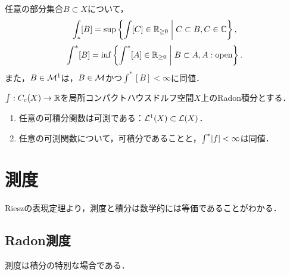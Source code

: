 \documentclass[uplatex,dvipdfmx]{jsreport}
\begin{document}
\begin{lemma}\label{lemma-regularity-of-Radon-integral}
    任意の部分集合$B\subset X$について，
    \[\int_*[B]=\sup\left\{\int[C]\in\mathbb{R}_{\ge0}\;\middle|\;C\subset B,C\in\mathbb{C}\right\},\]
    \[\int^*[B]=\inf\left\{\int^*[A]\in\mathbb{R}_{\ge0}\;\middle|\;B\subset A,A:\text{open}\right\}.\]
    また，$B\in\mathcal{M}^1$は，$B\in\mathcal{M}$かつ$\int^*[B]<\infty$に同値．
\end{lemma}

\begin{theorem}\label{thm-Radon-integrability}
    $\int:C_c(X)\to\mathbb{R}$を局所コンパクトハウスドルフ空間$X$上のRadon積分とする．
    \begin{enumerate}
        \item 任意の可積分関数は可測である：$\mathcal{L}^1(X)\subset\mathcal{L}(X)$．
        \item 任意の可測関数について，可積分であることと，$\int^*\lvert f\rvert<\infty$は同値．
    \end{enumerate}
\end{theorem}

\section{測度}

\begin{tcolorbox}[colframe=ForestGreen, colback=ForestGreen!10!white,breakable,colbacktitle=ForestGreen!40!white,coltitle=black,fonttitle=\bfseries\sffamily,
title=]
    Rieszの表現定理より，測度と積分は数学的には等価であることがわかる．
\end{tcolorbox}

\subsection{Radon測度}

\begin{tcolorbox}[colframe=ForestGreen, colback=ForestGreen!10!white,breakable,colbacktitle=ForestGreen!40!white,coltitle=black,fonttitle=\bfseries\sffamily,
title=]
    測度は積分の特別な場合である．
\end{tcolorbox}
\end{document}
